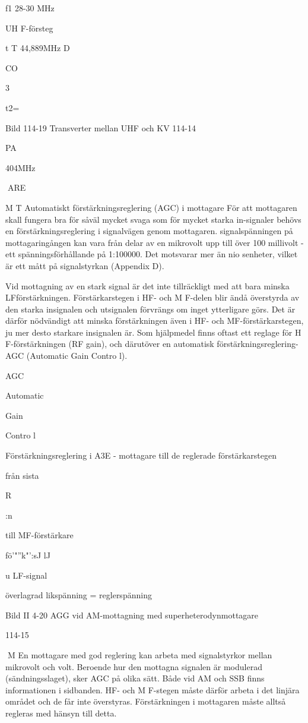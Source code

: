 f1 28-30 MHz

UH F-försteg

t
T 44,889MHz
D

CO

3

t2=

Bild 114-19 Transverter mellan UHF och KV
114-14

PA

404MHz

ARE

M T
Automatiskt förstärkningsreglering
(AGC) i mottagare
För att mottagaren skall fungera bra för
såväl mycket svaga som för mycket starka
in-signaler behövs en förstärkningsreglering
i signalvägen genom mottagaren. signalspänningen på mottagaringången kan vara
från delar av en mikrovolt upp till över 100
millivolt - ett spänningsförhållande på
1:100000. Det motsvarar mer än nio senheter, vilket är ett mått på signalstyrkan
(Appendix D).

Vid mottagning av en stark signal är det
inte tillräckligt med att bara minska LFförstärkningen. Förstärkarstegen i HF- och
M F-delen blir ändå överstyrda av den starka
insignalen och utsignalen förvrängs om inget ytterligare görs. Det är därför nödvändigt
att minska förstärkningen även i HF- och
MF-förstärkarstegen, ju mer desto starkare
insignalen är. Som hjälpmedel finns oftast
ett reglage för H F-förstärkningen (RF gain),
och därutöver en automatisk förstärkningsreglering- AGC (Automatic Gain Contro l).

AGC

Automatic

Gain

Contro l

Förstärkningsreglering i A3E - mottagare
till de reglerade förstärkarstegen

från sista

R

:n

till MF-förstärkare

fö'"''k"':sJ
lJ

u
LF-signal

överlagrad likspänning
= reglerspänning

Bild II 4-20 AGG vid AM-mottagning med superheterodynmottagare

114-15

M
En mottagare med god reglering kan
arbeta med signalstyrkor mellan mikrovolt
och volt. Beroende hur den mottagna signalen är modulerad (sändningsslaget), sker
AGC på olika sätt.
Både vid AM och SSB finns informationen i sidbanden. HF- och M F-stegen måste
därför arbeta i det linjära området och de får
inte överstyras. Förstärkningen i mottagaren måste alltså regleras med hänsyn till
detta.

